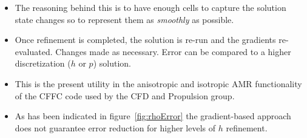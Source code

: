 \begin{itemize}
\item The reasoning behind this is to have enough cells to capture the solution state changes so to represent them as \textit{smoothly} as possible.
\item Once refinement is completed, the solution is re-run and the gradients re-evaluated. Changes made as necessary. Error can be compared to a higher discretization ($h$ or $p$) solution.
\item This is the present utility in the anisotropic and isotropic AMR functionality of the CFFC code used by the CFD and Propulsion group.
\item As has been indicated in figure~\ref{fig:rhoError} the gradient-based approach does not guarantee error reduction for higher levels of $h$ refinement.
\end{itemize}


